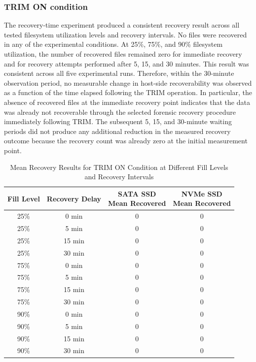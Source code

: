 \subsubsection*{TRIM ON condition}
The recovery-time experiment produced a consistent recovery result across all tested filesystem utilization levels and recovery intervals. No files were recovered in any 
of the experimental conditions. At 25\%, 75\%, and 90\% filesystem utilization, the number of recovered files remained zero for immediate recovery and for recovery 
attempts performed after 5, 15, and 30 minutes. This result was consistent across all five experimental runs. Therefore, within the 30-minute observation period, no 
measurable change in host-side recoverability was observed as a function of the time elapsed following the TRIM operation. In particular, the absence of recovered files 
at the immediate recovery point indicates that the data was already not recoverable through the selected forensic recovery procedure immediately following TRIM. The 
subsequent 5, 15, and 30-minute waiting periods did not produce any additional reduction in the measured recovery outcome because the recovery count was already zero 
at the initial measurement point.

\begin{table}[H]
    \centering
    \caption{Mean Recovery Results for TRIM ON Condition at Different Fill Levels and Recovery Intervals}
    \label{tab:recovery-results}

    \begin{tabular}{c c c c}
        \toprule
        \textbf{Fill Level} & \textbf{Recovery Delay} &
        \makecell{\textbf{SATA SSD}\\\textbf{Mean Recovered}} &
        \makecell{\textbf{NVMe SSD}\\\textbf{Mean Recovered}} \\
        \midrule
        25\% & 0 min  & 0 & 0 \\
        25\% & 5 min  & 0 & 0 \\
        25\% & 15 min & 0 & 0 \\
        25\% & 30 min & 0 & 0 \\
        75\% & 0 min  & 0 & 0 \\
        75\% & 5 min  & 0 & 0 \\
        75\% & 15 min & 0 & 0 \\
        75\% & 30 min & 0 & 0 \\
        90\% & 0 min  & 0 & 0 \\
        90\% & 5 min  & 0 & 0 \\
        90\% & 15 min & 0 & 0 \\
        90\% & 30 min & 0 & 0 \\
        \bottomrule
    \end{tabular}
\end{table}

